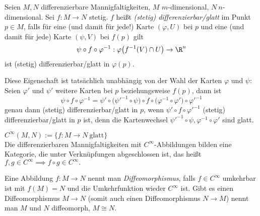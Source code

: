 \addtocounter{thm}{1}\lecture
\begin{defn}
	Seien $M,N$ differenzierbare Mannigfaltigkeiten, $M$ $m$-dimensional, $N\ n$-dimensional. Sei $ f: M \to N $  stetig. $f$ heißt \emph{(stetig) differenzierbar/glatt} im Punkt $p \in M$, falls für eine (und damit für jede!) Karte $ (\varphi,U) $ bei $p$ und eine (und damit für jede) Karte $ (\psi,V) $ bei $f(p)$ gilt
	\[ \psi \circ f \circ \varphi^{-1}: \varphi \big( f^{-1}(V) \cap U \big) \to \R^n \]
	ist (stetig) differenzierbar/glatt in $\varphi(p).$
\end{defn}

Diese Eigenschaft ist tatsächlich unabhängig von der Wahl der Karten $\varphi$ und $\psi$: Seien $ \varphi' $ und $\psi'$ weitere Karten bei $p$ beziehungsweise $f(p)$, dann ist 
\[ \psi \circ f \circ \varphi^{-1} = \psi' \circ \big( \psi'^{-1} \circ \psi \big) \circ f \circ \big( \varphi^{-1} \circ \varphi' \big) \circ \varphi'^{-1} \]
genau dann (stetig) differenzierbar/glatt in $p$, wenn $\psi' \circ f \circ \varphi'^{-1}$ (stetig) differenzierbar/glatt in $p$ ist, denn die Kartenwechsel $\psi'^{-1} \circ \psi, \varphi^{-1} \circ \varphi'$ sind glatt.

\begin{rem*}
	$ C^\infty (M,N) := \{ f: M \to N \ \text{glatt}\} $\\
	Die differenzierbaren Mannigfaltigkeiten mit $C^\infty$-Abbildungen bilden eine Kategorie, die unter Verknüpfungen abgeschlossen ist, das heißt $ f, g \in C^\infty \implies f \circ g \in C^\infty. $
\end{rem*}

\begin{defn}[Diffeomorphismus]
	Eine Abbildung $ f: M \to N $ nennt man \emph{Diffeomorphismus}, falls $ f \in C^\infty $ umkehrbar ist mit $ f(M)=N $ und die Umkehrfunktion wieder $C^\infty$ ist. Gibt es einen Diffeomorphismus $ M \to N $ (somit auch einen Diffeomorphismus $N \to M$) nennt man $M$ und $N$ diffeomorph, $M \cong N$.
\end{defn}

